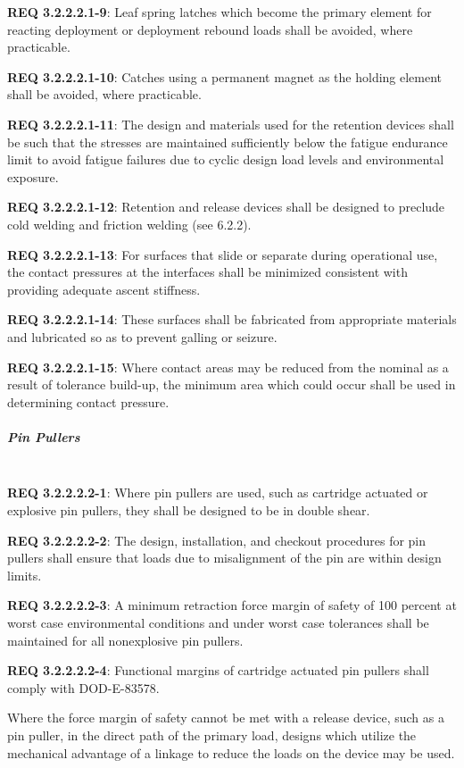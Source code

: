 \documentclass[12pt]{article}
\begin{document}
\noindent \textbf{REQ 3.2.2.2.1-9}: Leaf spring latches which become the primary element for reacting deployment or deployment rebound loads shall be avoided, where practicable. 

\noindent \textbf{REQ 3.2.2.2.1-10}: Catches using a permanent magnet as the holding element shall be avoided, where practicable. 

\noindent \textbf{REQ 3.2.2.2.1-11}: The design and materials used for the retention devices shall be such that the stresses are maintained sufficiently below the fatigue endurance limit to avoid fatigue failures due to cyclic design load levels and environmental exposure. 

\noindent \textbf{REQ 3.2.2.2.1-12}: Retention and release devices shall be designed to preclude cold welding and friction welding (see 6.2.2). 

\noindent \textbf{REQ 3.2.2.2.1-13}: For surfaces that slide or separate during operational use, the contact pressures at the interfaces shall be minimized consistent with providing adequate ascent stiffness. 

\noindent \textbf{REQ 3.2.2.2.1-14}: These surfaces shall be fabricated from appropriate materials and lubricated so as to prevent galling or seizure. 

\noindent \textbf{REQ 3.2.2.2.1-15}: Where contact areas may be reduced from the nominal as a result of tolerance build-up, the minimum area which could occur shall be used in determining contact pressure.


\subparagraph{Pin Pullers} \mbox{} \\ %
\noindent \textbf{REQ 3.2.2.2.2-1}: Where pin pullers are used, such as cartridge actuated or explosive pin pullers, they shall be designed to be in double shear. 

\noindent \textbf{REQ 3.2.2.2.2-2}: The design, installation, and checkout procedures for pin pullers shall ensure that loads due to misalignment of the pin are within design limits. 

\noindent \textbf{REQ 3.2.2.2.2-3}: A minimum retraction force margin of safety of 100 percent at worst case environmental conditions and under worst case tolerances shall be maintained for all nonexplosive pin pullers. 

\noindent \textbf{REQ 3.2.2.2.2-4}: Functional margins of cartridge actuated pin pullers shall comply with DOD-E-83578. 

Where the force margin of safety cannot be met with a release device, such as a pin puller, in the direct path of the primary load, designs which utilize the mechanical advantage of a linkage to reduce the loads on the device may be used. 
\end{document}
